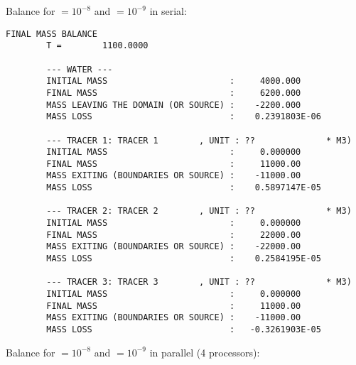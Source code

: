 \bigskip
Balance for  $= 10^{-8}$ and
 $= 10^{-9}$ in serial:

\begin{lstlisting}[language=TelFortran]
                        FINAL MASS BALANCE
        T =        1100.0000

        --- WATER ---
        INITIAL MASS                        :     4000.000
        FINAL MASS                          :     6200.000
        MASS LEAVING THE DOMAIN (OR SOURCE) :    -2200.000
        MASS LOSS                           :    0.2391803E-06

        --- TRACER 1: TRACER 1        , UNIT : ??              * M3)
        INITIAL MASS                        :     0.000000
        FINAL MASS                          :     11000.00
        MASS EXITING (BOUNDARIES OR SOURCE) :    -11000.00
        MASS LOSS                           :    0.5897147E-05

        --- TRACER 2: TRACER 2        , UNIT : ??              * M3)
        INITIAL MASS                        :     0.000000
        FINAL MASS                          :     22000.00
        MASS EXITING (BOUNDARIES OR SOURCE) :    -22000.00
        MASS LOSS                           :    0.2584195E-05

        --- TRACER 3: TRACER 3        , UNIT : ??              * M3)
        INITIAL MASS                        :     0.000000
        FINAL MASS                          :     11000.00
        MASS EXITING (BOUNDARIES OR SOURCE) :    -11000.00
        MASS LOSS                           :   -0.3261903E-05
\end{lstlisting}

\bigskip
Balance for  $= 10^{-8}$ and
 $= 10^{-9}$ in parallel
(4 processors):

